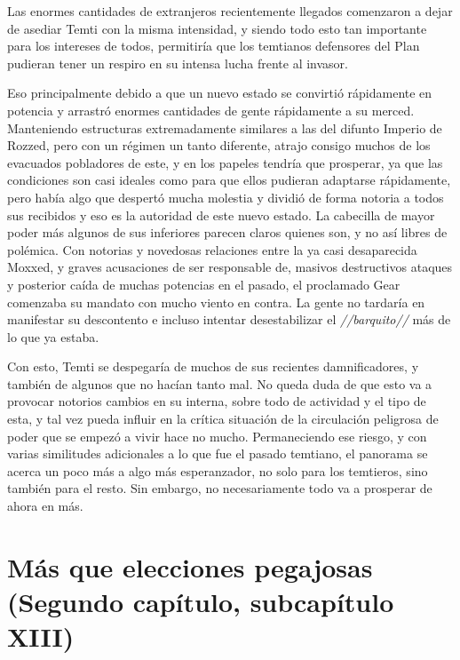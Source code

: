 \documentclass[
  spanish,
]{book}
\begin{document}
Las enormes cantidades de extranjeros recientemente llegados comenzaron a dejar de asediar Temti con la misma intensidad, y siendo todo esto tan importante para los intereses de todos, permitiría que los temtianos defensores del Plan pudieran tener un respiro en su intensa lucha frente al invasor.

Eso principalmente debido a que un nuevo estado se convirtió rápidamente en potencia y arrastró enormes cantidades de gente rápidamente a su merced. Manteniendo estructuras extremadamente similares a las del difunto Imperio de Rozzed, pero con un régimen un tanto diferente, atrajo consigo muchos de los evacuados pobladores de este, y en los papeles tendría que prosperar, ya que las condiciones son casi ideales como para que ellos pudieran adaptarse rápidamente, pero había algo que despertó mucha molestia y dividió de forma notoria a todos sus recibidos y eso es la autoridad de este nuevo estado. La cabecilla de mayor poder más algunos de sus inferiores parecen claros quienes son, y no así libres de polémica. Con notorias y novedosas relaciones entre la ya casi desaparecida Moxxed, y graves acusaciones de ser responsable de, masivos destructivos ataques y posterior caída de muchas potencias en el pasado, el proclamado Gear comenzaba su mandato con mucho viento en contra. La gente no tardaría en manifestar su descontento e incluso intentar desestabilizar el \emph{//barquito//} más de lo que ya estaba.

Con esto, Temti se despegaría de muchos de sus recientes damnificadores, y también de algunos que no hacían tanto mal. No queda duda de que esto va a provocar notorios cambios en su interna, sobre todo de actividad y el tipo de esta, y tal vez pueda influir en la crítica situación de la circulación peligrosa de poder que se empezó a vivir hace no mucho. Permaneciendo ese riesgo, y con varias similitudes adicionales a lo que fue el pasado temtiano, el panorama se acerca un poco más a algo más esperanzador, no solo para los temtieros, sino también para el resto. Sin embargo, no necesariamente todo va a prosperar de ahora en más.

\hypertarget{muxe1s-que-elecciones-pegajosas-segundo-capuxedtulo-subcapuxedtulo-xiii}{%
\section{Más que elecciones pegajosas (Segundo capítulo, subcapítulo XIII)}\label{muxe1s-que-elecciones-pegajosas-segundo-capuxedtulo-subcapuxedtulo-xiii}}
\end{document}
